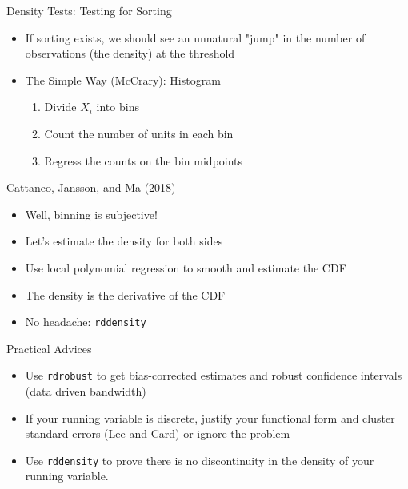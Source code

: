 \documentclass[]{beamer}
\begin{document}
\begin{frame}{Density Tests: Testing for Sorting}
    \begin{itemize}
        \item If sorting exists, we should see an unnatural "jump" in the number of observations (the density) at the threshold
        \item The Simple Way (McCrary): Histogram
            \begin{enumerate}
                \item Divide $X_i$ into bins
                \item Count the number of units in each bin
                \item Regress the counts on the bin midpoints
            \end{enumerate}
    \end{itemize}
\end{frame}

\begin{frame}{Cattaneo, Jansson, and Ma (2018)}
    \begin{itemize}
        \item Well, binning is subjective!
        \item Let's estimate the density for both sides
        \item Use local polynomial regression to smooth and estimate the CDF
        \item The density is the derivative of the CDF
        \item No headache: \texttt{rddensity}
    \end{itemize}
\end{frame}

\begin{frame}{Practical Advices}
    \begin{itemize}
        \item Use \texttt{rdrobust} to get bias-corrected estimates and robust confidence intervals (data driven bandwidth)
        \item If your running variable is discrete, justify your functional form and cluster standard errors (Lee and Card) or ignore the problem
        \item Use \texttt{rddensity} to prove there is no discontinuity in the density of your running variable.
    \end{itemize}
\end{frame}
\end{document}
